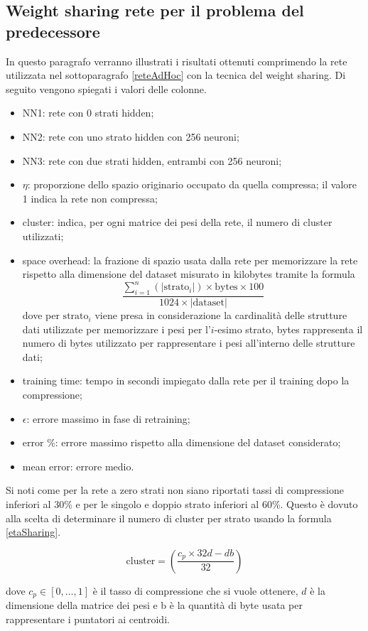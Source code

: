 \documentclass[12pt]{report}
\begin{document}
\subsection{Weight sharing rete per il problema del predecessore}
In questo paragrafo verranno illustrati i risultati ottenuti comprimendo la rete utilizzata nel sottoparagrafo \ref{reteAdHoc} con la tecnica del weight sharing.
Di seguito vengono spiegati i valori delle colonne.
\begin{itemize}
\item{NN1}: rete con 0 strati hidden;
\item{NN2}: rete con uno strato hidden con 256 neuroni;
\item{NN3}: rete con due strati hidden, entrambi con 256 neuroni;
\item{$\eta$}: proporzione dello spazio originario occupato da quella compressa; il valore 1 indica la rete non compressa;
\item{cluster}: indica, per ogni matrice dei pesi della rete, il numero di cluster utilizzati;
\item{space overhead}: la frazione di spazio usata dalla rete per memorizzare la rete rispetto alla dimensione del dataset misurato in kilobytes tramite la formula 
$$\displaystyle{\frac{\sum_{i=1}^n \left(|\mathrm{strato}_i|\right) \times \mathrm{bytes} \times 100}{1024 \times \left| \mathrm{dataset} \right|}}$$ dove per $\mathrm{strato}_i$ viene presa in considerazione la cardinalità delle strutture dati utilizzate per memorizzare i pesi per l'$i$-esimo strato, bytes rappresenta il numero di bytes utilizzato per rappresentare i pesi all'interno delle strutture dati;
\item{training time}: tempo in secondi impiegato dalla rete per il training dopo la compressione;
\item{$\epsilon$}: errore massimo in fase di retraining;
\item{error \%}: errore massimo rispetto alla dimensione del dataset considerato;
\item{mean error}: errore medio.
\end{itemize}
\par\null\par
Si noti come per la rete a zero strati non siano riportati tassi di compressione inferiori al 30\% e per le singolo e doppio strato inferiori al 60\%. Questo è dovuto alla scelta di determinare il numero di cluster per strato usando la formula \eqref{etaSharing}.

\begin{equation}
\mathrm{cluster}=\left(\frac{c_p \times 32d - db}{32}\right)
\label{etaSharing}
\end{equation}
\par\null\par
dove $c_p \in [0,\dots,1]$ è il tasso di compressione che si vuole ottenere, $d$ è la dimensione della matrice dei pesi e b è la quantità di byte usata per rappresentare i puntatori ai centroidi.
\end{document}
